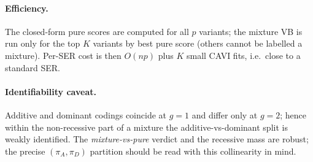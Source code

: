 \documentclass[11pt]{article}
\begin{document}
\paragraph{Efficiency.} The closed-form pure scores are computed for all $p$
variants; the mixture VB is run only for the top $K$ variants by best pure score
(others cannot be labelled a mixture). Per-SER cost is then $O(np)$ plus $K$ small
CAVI fits, i.e.\ close to a standard SER.

\paragraph{Identifiability caveat.} Additive and dominant codings coincide at
$g{=}1$ and differ only at $g{=}2$; hence within the non-recessive part of a
mixture the additive-vs-dominant split is weakly identified. The
\emph{mixture-vs-pure} verdict and the recessive mass are robust; the precise
$(\pi_A,\pi_D)$ partition should be read with this collinearity in mind.
\end{document}
